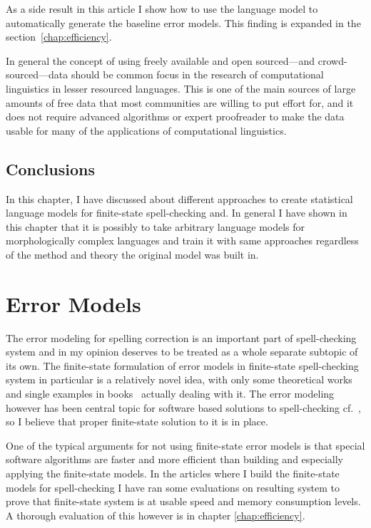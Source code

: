 \documentclass[officiallayout]{unihelcompling}
\begin{document}
As a side result in this article I show how to use the language model to
automatically generate the baseline error models. This finding is expanded in
the section~\ref{chap:efficiency}.

In general the concept of using freely available and open sourced---and
crowd-sourced---data should be common focus in the research of computational
linguistics in lesser resourced languages. This is one of the main sources of
large amounts of free data that most communities are willing to put effort for,
and it does not require advanced algorithms or expert proofreader to make the
data usable for many of the applications of computational linguistics.

\section{Conclusions}

In this chapter, I have discussed about different approaches to create
statistical language models for finite-state spell-checking and.  In general I
have shown in this chapter that it is possibly to take arbitrary language
models for morphologically complex languages and train it with same approaches
regardless of the method and theory the original model was built in.


\chapter{Error Models}
\label{chap:error-models}

The error modeling for spelling correction is an important part of
spell-checking system and in my opinion deserves to be treated as a whole
separate subtopic of its own. The finite-state formulation of error models in
finite-state spell-checking system in particular is a relatively novel idea,
with only some theoretical works \citep{agata2002typographical,mohri2003edit}
and single examples in books~\citep{beesley2003finite} actually dealing with
it.  The error modeling however has been central topic for software based
solutions to spell-checking
cf.~\citet{deorowicz2005correcting,kukich1992spelling,mitton2009ordering,deorowicz2005correcting},
so I believe that proper finite-state solution to it is in place.

One of the typical arguments for not using finite-state error models is that
special software algorithms are faster and more efficient than building and
especially applying the finite-state models. In the articles where I build
the finite-state models for spell-checking I have ran some evaluations on
resulting system to prove that finite-state system is at usable speed
and memory consumption levels. A thorough evaluation of this however
is in chapter \ref{chap:efficiency}.
\end{document}
